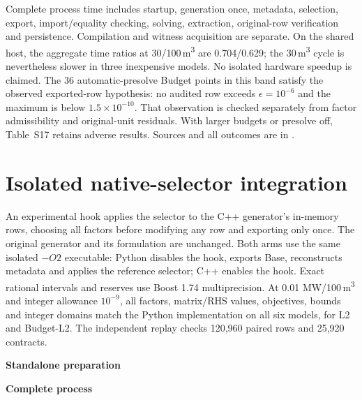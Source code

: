 \documentclass[11pt]{article}
\begin{document}
Complete process time includes startup, generation once, metadata, selection,
export, import/equality checking, solving, extraction, original-row verification
and persistence. Compilation and witness acquisition are separate. On the shared
host, the aggregate time ratios at 30/100\,m\textsuperscript{3} are 0.704/0.629;
the 30\,m\textsuperscript{3} cycle is nevertheless slower in three inexpensive
models. No isolated hardware speedup is claimed. The 36 automatic-presolve
Budget points in this band satisfy the observed exported-row hypothesis:
no audited row exceeds $\epsilon=10^{-6}$ and the maximum is below $1.5\times10^{-10}$.
That observation is checked separately from factor admissibility and original-unit
residuals. With larger budgets or presolve off, Table~S17 retains adverse results.
Sources and all outcomes are in .

\FloatBarrier
\section{Isolated native-selector integration}
An experimental hook applies the selector to the C++ generator's in-memory rows,
choosing all factors before modifying any row and exporting only once. The
original generator and its formulation are unchanged. Both arms use the same
isolated $-O2$ executable: Python disables the hook, exports Base, reconstructs
metadata and applies the reference selector; C++ enables the hook. Exact rational
intervals and reserves use Boost 1.74 multiprecision. At 0.01 MW/100\,m\textsuperscript{3}
and integer allowance $10^{-9}$, all factors, matrix/RHS values, objectives, bounds
and integer domains match the Python implementation on all six models, for L2
and Budget-L2. The independent replay checks 120,960 paired rows and 25,920 contracts.

\begin{table}[tb]
\centering\small
\caption{Two separate Budget-L2 implementation benchmarks. Preparation reports
medians of seven repeats per arm/model; speedup is Python/C++.
The complete cycle reports geometric means over seeds 59, 71, 89; its ratio is
C++/Python, with aggregate paired ratio 0.824. The former includes startup,
generation, selection, export and persistence; the latter additionally includes
native import/data checks, solving and physical verification. Compilation and
prior witness acquisition are separate. These are shared-host measurements,
not general hardware speedups.}
\label{tab:native-selection-cost}
\textbf{Standalone preparation}\par\smallskip

\par\medskip\textbf{Complete process}\par\smallskip

\end{table}
\end{document}
